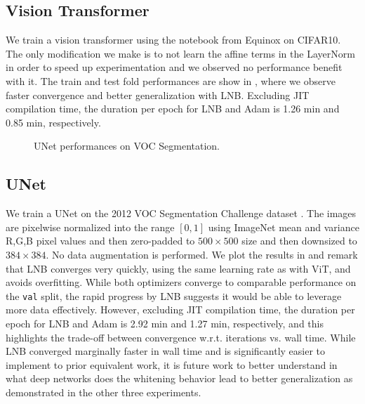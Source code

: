 \subsection{Vision Transformer}
We train a vision transformer \cite{vit} using the notebook from Equinox \cite{eqx}
on CIFAR10.
The only modification we make is to not learn the affine terms in the LayerNorm
in order to speed up experimentation and we observed no performance benefit with it.
The train and test fold performances are show in , where we observe
faster convergence and better generalization with LNB. Excluding JIT compilation time,
the duration per epoch for LNB and Adam is 1.26 min and 0.85 min, respectively. 

\begin{figure}[t]
    \begin{center}
    \caption{UNet performances on VOC Segmentation.}
    \label{fig:unet}
    \end{center}
\end{figure}

\subsection{UNet}
We train a UNet \cite{unet} on the 2012 VOC Segmentation Challenge dataset \cite{voc}. The images are
pixelwise normalized into the range $[0,1]$ using ImageNet mean and variance R,G,B pixel values
and then zero-padded to $500 \times 500$ size and then downsized to $384 \times 384$.
No data augmentation is performed. We plot the results in  and
remark that LNB converges very quickly, using the same learning rate as with ViT, and
avoids overfitting. While both optimizers converge to comparable performance on the
\texttt{val} split, the rapid progress by LNB suggests it would be able to leverage
more data effectively.
However, excluding JIT compilation time,
the duration per epoch for LNB and Adam is 2.92 min and 1.27 min, respectively, and
this highlights the trade-off between convergence w.r.t. iterations vs. wall time.
While LNB converged marginally faster in wall time and is significantly
easier to implement to prior equivalent work, it is future work to better understand
in what deep networks does the whitening behavior lead to better generalization as
demonstrated in the other three experiments.
